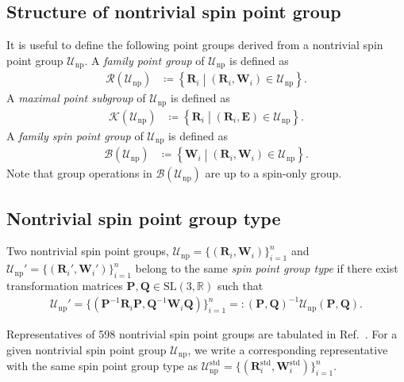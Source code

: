 \documentclass[a4paper, 11pt]{article}
\theoremstyle{definition}
\newcommand{\term}[1]{\textit{#1}}
\newcommand{\relmiddle}[1]{\mathrel{}\middle#1\mathrel{}}
\newcommand{\set}[2]{\left\{ #1 \relmiddle| #2 \right\}}
\begin{document}
\subsection{Structure of nontrivial spin point group}

It is useful to define the following point groups derived from a nontrivial spin point group $\mathcal{U}_{\mathrm{np}}$.
A \term{family point group} of $\mathcal{U}_{\mathrm{np}}$ is defined as
\begin{align}
  \mathcal{R}(\mathcal{U}_{\mathrm{np}})
    &\coloneqq \set{ \bm{R}_{i} }{ (\bm{R}_{i}, \bm{W}_{i}) \in \mathcal{U}_{\mathrm{np}} }.
\end{align}
A \term{maximal point subgroup} of $\mathcal{U}_{\mathrm{np}}$ is defined as
\begin{align}
  \mathcal{K}(\mathcal{U}_{\mathrm{np}})
    &\coloneqq \set{ \bm{R}_{i} }{ (\bm{R}_{i}, \bm{E}) \in \mathcal{U}_{\mathrm{np}} }.
\end{align}
A \term{family spin point group} of $\mathcal{U}_{\mathrm{np}}$ is defined as
\begin{align}
  \mathcal{B}(\mathcal{U}_{\mathrm{np}})
    &\coloneqq \set{ \bm{W}_{i} }{ (\bm{R}_{i}, \bm{W}_{i}) \in \mathcal{U}_{\mathrm{np}} }.
\end{align}
Note that group operations in $\mathcal{B}(\mathcal{U}_{\mathrm{np}})$ are up to a spin-only group.

\subsection{Nontrivial spin point group type}

Two nontrivial spin point groups, $\mathcal{U}_{\mathrm{np}} = \{ (\bm{R}_{i}, \bm{W}_{i}) \}_{i=1}^{n}$ and $\mathcal{U}_{\mathrm{np}}'= \{ (\bm{R}_{i}', \bm{W}_{i}') \}_{i=1}^{n}$ belong to the same \term{spin point group type} if there exist transformation matrices $\bm{P}, \bm{Q} \in \mathrm{SL}(3, \mathbb{R})$ such that
\begin{align}
  \mathcal{U}_{\mathrm{np}}'
    = \{ (\bm{P}^{-1} \bm{R}_{i} \bm{P}, \bm{Q}^{-1} \bm{W}_{i} \bm{Q}) \}_{i=1}^{n}
    =: (\bm{P}, \bm{Q})^{-1} \mathcal{U}_{\mathrm{np}} (\bm{P}, \bm{Q}).
\end{align}

Representatives of 598 nontrivial spin point groups are tabulated in Ref.~\cite{Litvin:a14103}.
For a given nontrivial spin point group $\mathcal{U}_{\mathrm{np}}$, we write a corresponding representative with the same spin point group type as $\mathcal{U}_{\mathrm{np}}^{\mathrm{std}} = \{ (\bm{R}_{i}^{\mathrm{std}}, \bm{W}_{i}^{\mathrm{std}}) \}_{i=1}^{n}$.
\end{document}
